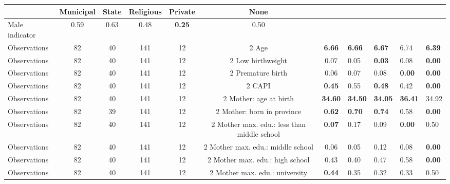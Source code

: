 \begin{tabular}{l c c c c c c }
\toprule
& \textbf{Municipal} & \textbf{State} & \textbf{Religious} & \textbf{Private} & \textbf{None} \\
\midrule
Male indicator &      0.59 &      0.63 &      0.48 & \textbf{     0.25} &      0.50 \\
\midrule
Observations &        82 &        40 &       141 &        12 &         2
Age & \textbf{     6.66} & \textbf{     6.66} & \textbf{     6.67} &      6.74 & \textbf{     6.39} \\
\midrule
Observations &        82 &        40 &       141 &        12 &         2
Low birthweight &      0.07 &      0.05 & \textbf{     0.03} &      0.08 & \textbf{     0.00} \\
\midrule
Observations &        82 &        40 &       141 &        12 &         2
Premature birth &      0.06 &      0.07 &      0.08 & \textbf{     0.00} & \textbf{     0.00} \\
\midrule
Observations &        82 &        40 &       141 &        12 &         2
CAPI & \textbf{     0.45} &      0.55 & \textbf{     0.48} &      0.42 & \textbf{     0.00} \\
\midrule
Observations &        82 &        40 &       141 &        12 &         2
Mother: age at birth & \textbf{    34.60} & \textbf{    34.50} & \textbf{    34.05} & \textbf{    36.41} &     34.92 \\
\midrule
Observations &        82 &        39 &       141 &        12 &         2
Mother: born in province & \textbf{     0.62} & \textbf{     0.70} & \textbf{     0.74} &      0.58 & \textbf{     0.00} \\
\midrule
Observations &        82 &        40 &       141 &        12 &         2
Mother max. edu.: less than middle school & \textbf{     0.07} &      0.17 &      0.09 & \textbf{     0.00} &      0.50 \\
\midrule
Observations &        82 &        40 &       141 &        12 &         2
Mother max. edu.: middle school &      0.06 &      0.05 &      0.12 &      0.08 & \textbf{     0.00} \\
\midrule
Observations &        82 &        40 &       141 &        12 &         2
Mother max. edu.: high school &      0.43 &      0.40 &      0.47 &      0.58 & \textbf{     0.00} \\
\midrule
Observations &        82 &        40 &       141 &        12 &         2
Mother max. edu.: university & \textbf{     0.44} &      0.35 &      0.32 &      0.33 &      0.50 \\

\end{tabular}
